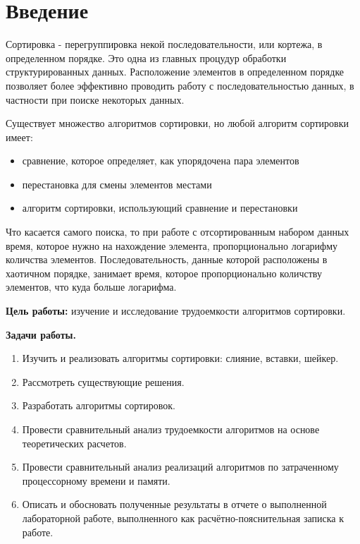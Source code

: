 \chapter*{Введение}

Сортировка - перегруппировка некой последовательности, или кортежа, в определенном порядке. Это одна из главных процудур обработки структурированных данных. Расположение элементов в определенном порядке позволяет более эффективно проводить работу с последовательностью данных, в частности при поиске некоторых данных. \newline

Существует множество алгоритмов сортировки, но любой алгоритм сортировки имеет:
\begin{itemize}
	\item сравнение, которое определяет, как упорядочена пара элементов
    \item перестановка для смены элементов местами
    \item алгоритм сортировки, использующий сравнение и перестановки \newline
\end{itemize}

Что касается самого поиска, то при работе с отсортированным набором данных время, которое нужно на нахождение элемента, пропорционально логарифму количства элементов. Последовательность, данные которой расположены в хаотичном порядке, занимает время, которое пропорционально количству элементов, что куда больше логарифма. \newline

\textbf{Цель работы:} изучение и исследование трудоемкости алгоритмов сортировки. \newline

\textbf{Задачи работы.}
\begin{enumerate}
	\item Изучить и реализовать алгоритмы сортировки: слияние, вставки, шейкер.
    \item Рассмотреть существующие решения.
    \item Разработать алгоритмы сортировок.
    \item Провести сравнительный анализ трудоемкости алгоритмов на основе теоретических расчетов.
    \item Провести сравнительный анализ реализаций алгоритмов по затраченному процессорному времени и памяти.
	\item Описать и обосновать полученные результаты в отчете о выполненной лабораторной работе, выполненного как расчётно-пояснительная записка к работе.
\end{enumerate}